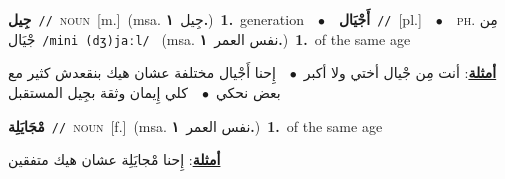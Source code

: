 \documentclass[10pt,a4paper,twoside]{article} %
\begin{document}
\begin{multicols}{2}
{\setlength\topsep{0pt}\textbf{\foreignlanguage{arabic}{جِيل}}\ {\color{gray}\texttt{//}\color{black}}\ \textsc{noun}\ [m.]\ \color{gray}(msa. \foreignlanguage{arabic}{جِيل}~\foreignlanguage{arabic}{\textbf{١.}})\color{black}\ \textbf{1.}~generation\ \ $\bullet$\ \ \setlength\topsep{0pt}\textbf{\foreignlanguage{arabic}{أَجْيَال}}\ {\color{gray}\texttt{//}\color{black}}\ [pl.]\ \ $\bullet$\ \ \textsc{ph.} \color{gray} \foreignlanguage{arabic}{مِن جْيَال}\color{black}\ {\color{gray}\texttt{/{\sffamily mini (dʒ)jaːl}/}\color{black}}\ \color{gray} (msa. \foreignlanguage{arabic}{نفس العمر}~\foreignlanguage{arabic}{\textbf{١.}})\color{black}\ \textbf{1.}~of the same age\  \begin{flushright}\color{gray}\foreignlanguage{arabic}{\textbf{\underline{\foreignlanguage{arabic}{أمثلة}}}: أنت مِن جْيال أختي ولا أكبر\ $\bullet$\ \  إِحنا أَجْيال مختلفة عشان هيك بنقعدش كثير مع بعض نحكي\ $\bullet$\ \  كلي إِيمان وثقة بجِيل المستقبل}\end{flushright}\color{black}} \vspace{2mm}

{\setlength\topsep{0pt}\textbf{\foreignlanguage{arabic}{مْجَايَلِة}}\ {\color{gray}\texttt{//}\color{black}}\ \textsc{noun}\ [f.]\ \color{gray}(msa. \foreignlanguage{arabic}{نفس العمر}~\foreignlanguage{arabic}{\textbf{١.}})\color{black}\ \textbf{1.}~of the same age\  \begin{flushright}\color{gray}\foreignlanguage{arabic}{\textbf{\underline{\foreignlanguage{arabic}{أمثلة}}}: إِحنا مْجايَلِة عشان هيك متفقين}\end{flushright}\color{black}} \vspace{2mm}

\end{multicols}
\end{document}
